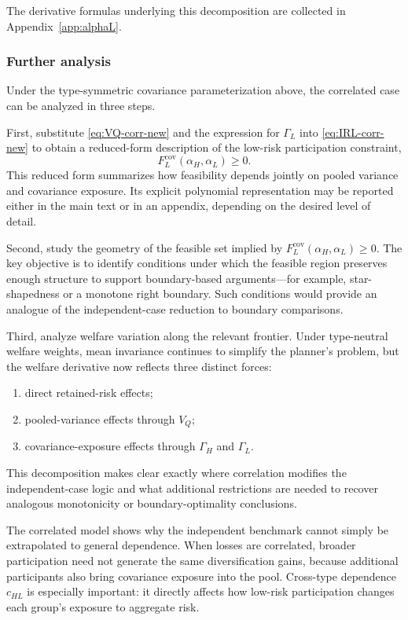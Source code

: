 \documentclass[a4paper,12pt]{article}
\theoremstyle{definition}
\theoremstyle{remark}
\newcommand{\1}{\mathbf{1}}
\begin{document}
The derivative formulas underlying this decomposition are collected in
Appendix~\ref{app:alphaL}.

\subsubsection{Further analysis}

Under the type-symmetric covariance parameterization above, the correlated case
can be analyzed in three steps.

First, substitute \eqref{eq:VQ-corr-new} and the expression for \(\Gamma_L\)
into \eqref{eq:IRL-corr-new} to obtain a reduced-form description of the
low-risk participation constraint,
\[
F_L^{\mathrm{cov}}(\alpha_H,\alpha_L)\ge 0.
\]
This reduced form summarizes how feasibility depends jointly on pooled variance
and covariance exposure. Its explicit polynomial representation may be reported
either in the main text or in an appendix, depending on the desired level of
detail.

Second, study the geometry of the feasible set implied by
\(F_L^{\mathrm{cov}}(\alpha_H,\alpha_L)\ge 0\). The key objective is to
identify conditions under which the feasible region preserves enough structure
to support boundary-based arguments---for example, star-shapedness or a
monotone right boundary. Such conditions would provide an analogue of the
independent-case reduction to boundary comparisons.

Third, analyze welfare variation along the relevant frontier. Under type-neutral
welfare weights, mean invariance continues to simplify the planner's problem,
but the welfare derivative now reflects three distinct forces:
\begin{enumerate}[leftmargin=2em]
    \item direct retained-risk effects;
    \item pooled-variance effects through \(V_Q\);
    \item covariance-exposure effects through \(\Gamma_H\) and \(\Gamma_L\).
\end{enumerate}
This decomposition makes clear exactly where correlation modifies the
independent-case logic and what additional restrictions are needed to recover
analogous monotonicity or boundary-optimality conclusions.

The correlated model shows why the independent benchmark cannot simply be
extrapolated to general dependence. When losses are correlated, broader
participation need not generate the same diversification gains, because
additional participants also bring covariance exposure into the pool.
Cross-type dependence \(c_{HL}\) is especially important: it directly affects
how low-risk participation changes each group's exposure to aggregate risk.
\end{document}
